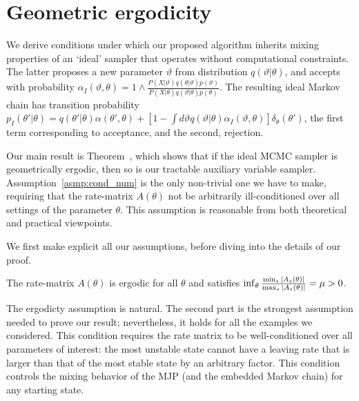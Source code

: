 \newpage
\section{Geometric ergodicity}
We derive conditions under which our proposed algorithm
inherits mixing properties of an `ideal' sampler that operates without
computational constraints. The latter proposes a new parameter $\vartheta$
from distribution $q(\vartheta|\theta)$, and accepts with probability 
$\alpha_I(\vartheta,\theta) = 1 \wedge \frac{P(X | \vartheta)q(\theta| \vartheta)p(\vartheta)}
      {P(X | \theta)q(\vartheta|\theta)p(\theta)}$. The resulting ideal
Markov chain has transition probability 
$p_I(\theta'|\theta) = q(\theta'|\theta)\alpha(\theta',\theta) + \left[1-\int d\vartheta
q(\vartheta|\theta)\alpha_I(\vartheta,\theta)\right]\delta_\theta(\theta')$, the first
term corresponding to acceptance, and the second, rejection.

Our main result is Theorem~\cite{}, which shows that if the ideal MCMC 
sampler is geometrically ergodic, then so is our tractable auxiliary 
variable sampler. Assumption~\ref{asmp:cond_num} is the only non-trivial 
one we have to make, requiring that the rate-matrix $A(\theta)$ not be 
arbitrarily ill-conditioned over all
settings of the parameter $\theta$. This assumption is reasonable from
both theoretical and practical viewpoints.

We first make explicit all our assumptions, before diving into the details
of our proof.
\begin{assumption}
  The rate-matrix $A(\theta)$ is ergodic for all $\theta$ and satisfies 
  $\inf_\theta \frac{{\min_s |A_s(\theta)|}}{{\max_s |A_s(\theta)|}} = \mu > 0$.
  \label{asmp:cond_num}
\end{assumption}
\noindent The ergodicty assumption is natural. The second part is the
strongest assumption needed to prove our result; nevertheless, it holds 
for all the examples we considered. This condition requires the rate 
matrix to be well-conditioned over all parameters of interest: the most 
unstable state cannot have a leaving rate that is larger than that of
the most stable state by an arbitrary factor. This condition controls the
mixing behavior of the MJP (and the embedded Markov chain) for any 
starting state. 

